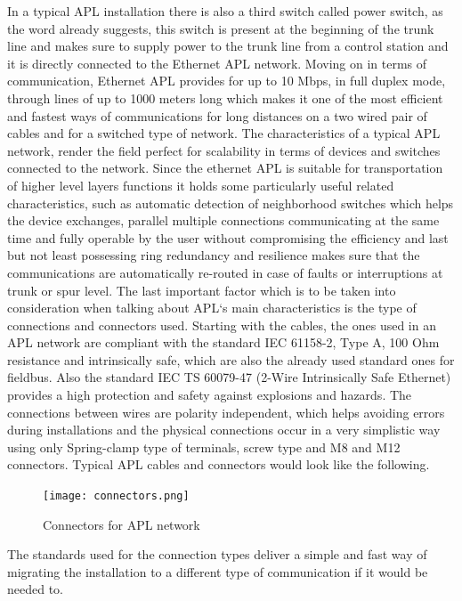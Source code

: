 \documentclass[conference]{IEEEtran}
\begin{document}
In a typical APL installation there is also a third switch called power switch, as the word already suggests, this switch is present at the beginning of the trunk line and makes sure to supply power to the trunk line from a control station and it is directly connected to the Ethernet APL network.
Moving on in terms of communication, Ethernet APL provides for up to 10 Mbps, in full duplex mode, through lines of up to 1000 meters long which makes it one of the most efficient and fastest ways of communications for long distances on a two wired pair of cables and for a switched type of network.
The characteristics of a typical APL network, render the field perfect for scalability in terms of devices and switches connected to the network. Since the ethernet APL is suitable for transportation of higher level layers functions it holds some particularly useful related characteristics, such as automatic detection of neighborhood switches which helps the device exchanges, parallel multiple connections communicating at the same time and fully operable by the user without compromising the efficiency and last but not least possessing ring redundancy and resilience makes sure that the communications are automatically re-routed in case of faults or interruptions at trunk or spur level.
The last important factor which is to be taken into consideration when talking about APL`s main characteristics is the type of connections and connectors used. Starting with the cables, the ones used in an APL network are compliant with the standard IEC 61158-2, Type A, 100 Ohm resistance and intrinsically safe, which are also the already used standard ones for fieldbus. Also the standard IEC TS 60079-47 (2-Wire Intrinsically Safe Ethernet) provides a high protection and safety against explosions and hazards. The connections between wires are polarity independent, which helps avoiding errors during installations and the physical connections occur in a very simplistic way using only Spring-clamp type of terminals, screw type and M8 and M12 connectors. Typical APL cables and connectors would look like the following.\cite{b8}
\begin{figure}[htbp]
    \centerline{\texttt{[image: connectors.png]}}
    \caption{Connectors for APL network \cite{b9}}
    \label{conn}
\end{figure}
The standards used for the connection types deliver a simple and fast way of migrating the installation to a different type of communication if it would be needed to.
\end{document}
